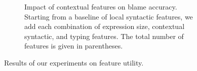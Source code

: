 \begin{figure}[t]
\begin{subfigure}[t]{\linewidth}
\caption{Impact of contextual features on blame accuracy. Starting from
  a baseline of local syntactic features, we add each combination of
  expression size, contextual syntactic, and typing features. The total
  number of features is given in parentheses.}
\label{fig:context-utility}
\end{subfigure}

\caption{
  Results of our experiments on feature utility.
%
}
\label{fig:slice-utility-results}
\end{figure}
